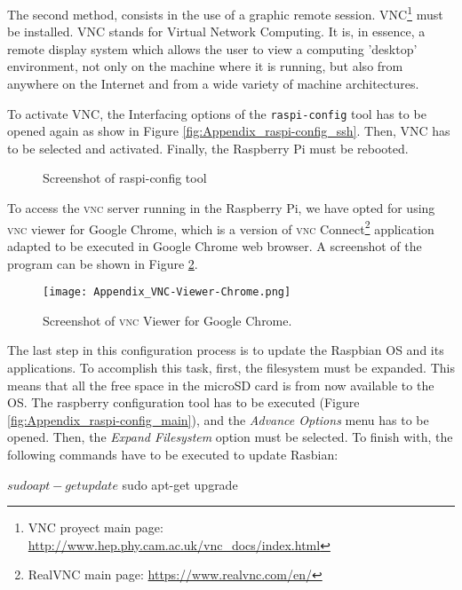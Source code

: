 The second method, consists in the use of a graphic remote session. VNC\footnote{VNC proyect main page: \url{http://www.hep.phy.cam.ac.uk/vnc_docs/index.html}} must be installed. VNC stands for Virtual Network Computing. It is, in essence, a remote display system which allows the user to view a computing 'desktop' environment, not only on the machine where it is running, but also from anywhere on the Internet and from a wide variety of machine architectures. 

To activate VNC, the Interfacing options of the \texttt{raspi-config} tool has to be opened again as show in Figure \ref{fig:Appendix_raspi-config_ssh}. Then, VNC has to be selected and activated. Finally, the Raspberry Pi must be rebooted.

\begin{figure}[!h]
	\centering
	\caption{Screenshot of raspi-config tool}
	\label{fig:Appendix_raspi-config}
\end{figure}

To access the \textsc{vnc} server running in the Raspberry Pi, we have opted for using \textsc{vnc} viewer for Google Chrome, which is a version of \textsc{vnc} Connect\footnote{RealVNC main page: \url{https://www.realvnc.com/en/}} application adapted to be executed in Google Chrome web browser. A screenshot of the program can be shown in Figure \ref{fig:Appendix_VNC-Viewer-Chrome}.

\begin{figure}[!h]
	\begin{center}
		\texttt{[image: Appendix\_VNC-Viewer-Chrome.png]}
		\caption{Screenshot of \textsc{vnc} Viewer for Google Chrome.}
		\label{fig:Appendix_VNC-Viewer-Chrome}
	\end{center}
\end{figure}

The last step in this configuration process is to update the Raspbian \ac{OS} and its applications. To accomplish this task, first, the filesystem must be expanded. This means that all the free space in the microSD card is from now available to the \ac{OS}. The raspberry configuration tool has to be executed (Figure \ref{fig:Appendix_raspi-config_main}), and the \emph{Advance Options} menu has to be opened. Then, the \emph{Expand Filesystem} option must be selected. To finish with, the following commands have to be executed to update Rasbian:
\begin{console}
$ sudo apt-get update
$ sudo apt-get upgrade
\end{console} %


